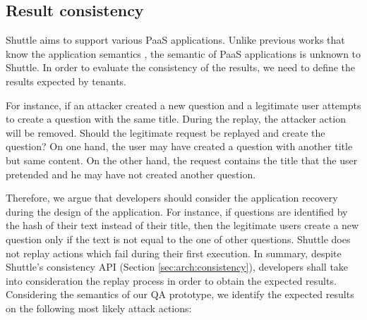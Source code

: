 



\subsection{Result consistency}\label{sec:eval:accuracy:consistency}
Shuttle aims to support various \ac{PaaS} applications. Unlike previous works that know the application semantics \cite{undoForOperators}, the semantic of \ac{PaaS} applications is unknown to Shuttle. In order to evaluate the consistency of the results, we need to define the results expected by tenants. 

For instance, if an attacker created a new question and a legitimate user attempts to create a question with the same title. During the replay, the attacker action will be removed. Should the legitimate request be replayed and create the question? On one hand, the user may have created a question with another title but same content. On the other hand, the request contains the title that the user pretended and he may have not created another question. 

Therefore, we argue that developers should consider the application recovery during the design of the application. For instance, if questions are identified by the hash of their text instead of their title, then the legitimate users create a new question only if the text is not equal to the one of other questions. Shuttle does not replay actions which fail during their first execution. In summary, despite Shuttle's consistency \ac{API} (Section \ref{sec:arch:consistency}), developers shall take into consideration the replay process in order to obtain the expected results.\\


Considering the semantics of our \ac{QA} prototype, we identify the expected results on the following most likely attack actions:

